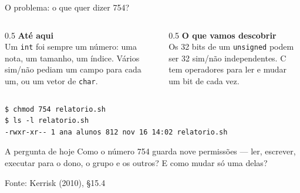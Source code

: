 \documentclass[aspectratio=169]{beamer}
\newcommand{\fonte}[1]{\vfill\hfill{\scriptsize\textcolor{UFSGray}{Fonte: #1}}}
\begin{document}
\begin{frame}[fragile]{O problema: o que quer dizer 754?}
  \vspace{-0.4em}
  \begin{columns}[T]
    \begin{column}{0.5\textwidth}
      \textbf{Até aqui}\\[0.3em]
      \small
      Um \texttt{int} foi sempre um número: uma nota, um tamanho, um índice.
      Vários sim/não pediam um campo para cada um, ou um
      vetor de \texttt{char}.
    \end{column}
    \begin{column}{0.5\textwidth}
      \textbf{O que vamos descobrir}\\[0.3em]
      \small
      Os 32 bits de um \texttt{unsigned} podem ser 32 sim/não independentes.
      C tem operadores para ler e mudar um bit de cada vez.
    \end{column}
  \end{columns}
  \smallskip
\begin{lstlisting}[style=shellStyle]
$ chmod 754 relatorio.sh
$ ls -l relatorio.sh
-rwxr-xr-- 1 ana alunos 812 nov 16 14:02 relatorio.sh
\end{lstlisting}
  \begin{block}{A pergunta de hoje}
    Como o número 754 guarda nove permissões --- ler, escrever, executar
    para o dono, o grupo e os outros? E como mudar só uma delas?
  \end{block}
  \fonte{Kerrisk (2010), §15.4~\cite{kerrisk2010linux}}
\end{frame}
\end{document}
